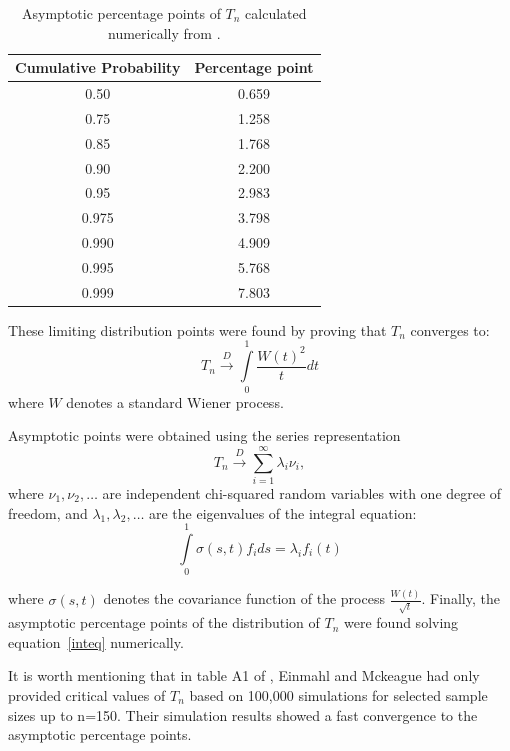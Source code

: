 \documentclass{elsarticle}
\begin{document}
\begin{table}[h!tb]
	\begin{center}
		{\renewcommand{\arraystretch}{1.2}%
	\begin{tabular}{|c|c|}
		\hline
		Cumulative Probability &Percentage point\\ 
		\hline
		\hline
		0.50&0.659\\
		\hline
		0.75&1.258\\
		\hline
		0.85&1.768\\
		\hline
		0.90&2.200\\
		\hline
		0.95&2.983\\
		\hline
		0.975&3.798\\
		\hline
		0.990&4.909\\
		\hline
		0.995&5.768\\
		\hline
		0.999&7.803\\
		\hline
		\hline
	\end{tabular}
	}
	\caption{Asymptotic percentage points of $T_n$ calculated numerically from  \cite{Coronel-Montoya}.}
	\label{tab:Cpoints}
	\end{center}
\end{table}

These limiting distribution points were found by proving that $T_n$ converges to:
\[
T_n \mathop \to \limits^D \int\limits_0^1 { \frac{W(t)^2}{t} dt}
\]
where $W$ denotes a standard Wiener process.

Asymptotic points were obtained using the series representation \cite{imhof}
\[
    T_n \mathop \to \limits^D \sum\limits_{i = 1}^\infty {\lambda _i \nu _i },
\] 
where $\nu_1,\nu_2,\ldots$ are independent chi-squared random variables with one degree of freedom, and $\lambda_1,\lambda_2,\ldots$ are the eigenvalues of the integral equation:
\begin{equation}
\int\limits_0^1 {\sigma (s,t)f_i ds = \lambda _i f_i (t)} 
\label{inteq}
\end{equation}

where $\sigma(s,t)$ denotes the covariance function of the process $\frac{W(t)}{\sqrt{t}}$. Finally, the asymptotic percentage points of the distribution of $T_n$ were found solving equation~\ref{inteq} numerically.

It is worth mentioning that in table A1 of \cite{Einmahl2}, Einmahl and Mckeague had only provided critical values of $T_{n}$ based on 100,000 simulations for selected sample sizes up to n=150. Their simulation results showed a fast convergence to the asymptotic percentage points.
\end{document}
